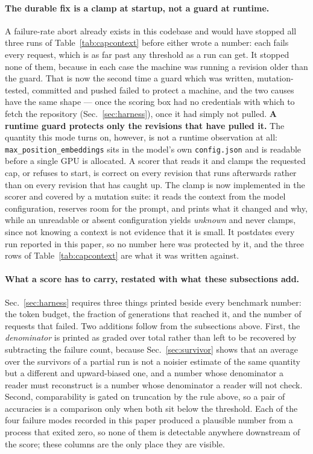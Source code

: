 \paragraph{The durable fix is a clamp at startup, not a guard at runtime.} A failure-rate
abort already exists in this codebase and would have stopped all three runs of
Table~\ref{tab:capcontext} before either wrote a number: each fails every request, which is
as far past any threshold as a run can get. It stopped none of them, because in each case the
machine was running a revision older than the guard. That is now the second time a guard which
was written, mutation-tested, committed and pushed failed to protect a machine, and the two
causes have the same shape --- once the scoring box had no credentials with which to fetch the
repository (Sec.~\ref{sec:harness}), once it had simply not pulled. \textbf{A runtime guard
protects only the revisions that have pulled it.} The quantity this mode turns on, however, is
not a runtime observation at all: \texttt{max\_position\_embeddings} sits in the model's own
\texttt{config.json} and is readable before a single GPU is allocated. A scorer that reads it
and clamps the requested cap, or refuses to start, is correct on every revision that runs
afterwards rather than on every revision that has caught up. The clamp is now implemented in
the scorer and covered by a mutation suite: it reads the context from the model configuration,
reserves room for the prompt, and prints what it changed and why, while an unreadable or absent
configuration yields \emph{unknown} and never clamps, since not knowing a context is not
evidence that it is small. It postdates every run reported in this paper, so no number here was
protected by it, and the three rows of Table~\ref{tab:capcontext} are what it was written
against.

\paragraph{What a score has to carry, restated with what these subsections add.}
Sec.~\ref{sec:harness} requires three things printed beside every benchmark number: the token
budget, the fraction of generations that reached it, and the number of requests that failed.
Two additions follow from the subsections above. First, the \emph{denominator} is printed as
graded over total rather than left to be recovered by subtracting the failure count, because
Sec.~\ref{sec:survivor} shows that an average over the survivors of a partial run is not a
noisier estimate of the same quantity but a different and upward-biased one, and a number
whose denominator a reader must reconstruct is a number whose denominator a reader will not
check. Second, comparability is gated on truncation by the rule above, so a pair of
accuracies is a comparison only when both sit below the threshold. Each of the four failure
modes recorded in this paper produced a plausible number from a process that exited zero, so
none of them is detectable anywhere downstream of the score; these columns are the only place
they are visible.

